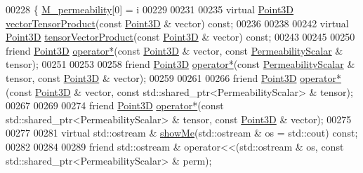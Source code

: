 \begin{DoxyCode}
00228         \{ \hyperlink{classFVCode3D_1_1PermeabilityBase_aef595aa25abfeaf51e8d242e5de2055d}{M\_permeability}[0] = i%
00229 
00231 
00235     \textcolor{keyword}{virtual} \hyperlink{classFVCode3D_1_1Point3D}{Point3D} \hyperlink{classFVCode3D_1_1PermeabilityBase_aa60c227795b5b7dd6413ef90b211875e}{vectorTensorProduct}(\textcolor{keyword}{const} \hyperlink{classFVCode3D_1_1Point3D}{Point3D} & vector) \textcolor{keyword}{const};
00236 
00238 
00242     \textcolor{keyword}{virtual} \hyperlink{classFVCode3D_1_1Point3D}{Point3D} \hyperlink{classFVCode3D_1_1PermeabilityBase_a1c77d0168dd4ee2e3a1ce922e0c1725c}{tensorVectorProduct}(\textcolor{keyword}{const} \hyperlink{classFVCode3D_1_1Point3D}{Point3D} & vector) \textcolor{keyword}{const};
00243 
00245 
00250     \textcolor{keyword}{friend} \hyperlink{classFVCode3D_1_1Point3D}{Point3D} \hyperlink{classFVCode3D_1_1PermeabilityBase_a04284b595d50559389f6098e76611b76}{operator*}(\textcolor{keyword}{const} \hyperlink{classFVCode3D_1_1Point3D}{Point3D} & vector, \textcolor{keyword}{const} 
      \hyperlink{classFVCode3D_1_1PermeabilityScalar}{PermeabilityScalar} & tensor);
00251 
00253 
00258     \textcolor{keyword}{friend} \hyperlink{classFVCode3D_1_1Point3D}{Point3D} \hyperlink{classFVCode3D_1_1PermeabilityBase_a04284b595d50559389f6098e76611b76}{operator*}(\textcolor{keyword}{const} \hyperlink{classFVCode3D_1_1PermeabilityScalar}{PermeabilityScalar} & tensor, \textcolor{keyword}{const} 
      \hyperlink{classFVCode3D_1_1Point3D}{Point3D} & vector);
00259 
00261 
00266     \textcolor{keyword}{friend} \hyperlink{classFVCode3D_1_1Point3D}{Point3D} \hyperlink{classFVCode3D_1_1PermeabilityBase_a04284b595d50559389f6098e76611b76}{operator*}(\textcolor{keyword}{const} \hyperlink{classFVCode3D_1_1Point3D}{Point3D} & vector, \textcolor{keyword}{const} 
      std::shared\_ptr<PermeabilityScalar> & tensor);
00267 
00269 
00274     \textcolor{keyword}{friend} \hyperlink{classFVCode3D_1_1Point3D}{Point3D} \hyperlink{classFVCode3D_1_1PermeabilityBase_a04284b595d50559389f6098e76611b76}{operator*}(\textcolor{keyword}{const} std::shared\_ptr<PermeabilityScalar> & tensor, \textcolor{keyword}{const} 
      \hyperlink{classFVCode3D_1_1Point3D}{Point3D} & vector);
00275 
00277 
00281     \textcolor{keyword}{virtual} std::ostream & \hyperlink{classFVCode3D_1_1PermeabilityBase_a4f06952af19c0100b6b6043fa1f8f97a}{showMe}(std::ostream & os = std::cout) \textcolor{keyword}{const};
00282 
00284 
00289     \textcolor{keyword}{friend} std::ostream & operator<<(std::ostream & os, const std::shared\_ptr<PermeabilityScalar> & perm);

\end{DoxyCode}
